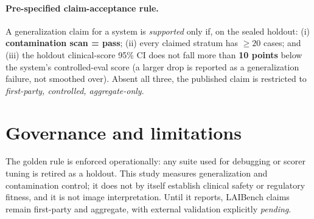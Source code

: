 \documentclass[11pt]{article}
\begin{document}
\paragraph{Pre-specified claim-acceptance rule.} A generalization claim for a system is \emph{supported} only if, on the sealed holdout: (i) \textbf{contamination scan = pass}; (ii) every claimed stratum has $\geq 20$ cases; and (iii) the holdout clinical-score 95\% CI does not fall more than \textbf{10 points} below the system's controlled-eval score (a larger drop is reported as a generalization failure, not smoothed over). Absent all three, the published claim is restricted to \emph{first-party, controlled, aggregate-only}.

\section{Governance and limitations}
The golden rule is enforced operationally: any suite used for debugging or scorer tuning is retired as a holdout. This study measures generalization and contamination control; it does not by itself establish clinical safety or regulatory fitness, and it is not image interpretation. Until it reports, LAIBench claims remain first-party and aggregate, with external validation explicitly \emph{pending}.
\end{document}
